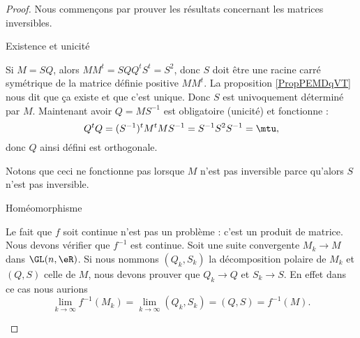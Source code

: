 \begin{proof}
    Nous commençons par prouver les résultats concernant les matrices inversibles.
    \begin{subproof}
        \item[Existence et unicité]

            Si \( M=SQ\), alors \( MM^t=SQQ^tS^t=S^2\), donc \( S\) doit être une racine carré symétrique de la matrice définie positive \( MM^t\). La proposition \ref{PropPEMDqVT} nous dit que ça existe et que c'est unique. Donc \( S\) est univoquement déterminé par \( M\). Maintenant avoir \( Q=MS^{-1}\) est obligatoire (unicité) et fonctionne :
            \begin{equation}
                Q^tQ=(S^{-1})^tM^tMS^{-1}=S^{-1}S^2S^{-1}=\mtu,
            \end{equation}
            donc \( Q\) ainsi défini est orthogonale.

            Notons que ceci ne fonctionne pas lorsque \( M\) n'est pas inversible parce qu'alors \( S\) n'est pas inversible.
        
        \item[Homéomorphisme]

            Le fait que \( f\) soit continue n'est pas un problème : c'est un produit de matrice. Nous devons vérifier que \( f^{-1}\) est continue. Soit une suite convergente \( M_k\to M\) dans \( \GL(n,\eR)\). Si nous nommons \( (Q_k,S_k)\) la décomposition polaire de \( M_k\) et \( (Q,S)\) celle de \( M\), nous devons prouver que \( Q_k\to Q\) et \( S_k\to S\). En effet dans ce cas nous aurions
            \begin{equation}    \label{EqJIkoaJv}
                \lim_{k\to \infty} f^{-1}(M_k)=\lim_{k\to \infty} (Q_k,S_k)=(Q,S)=f^{-1}(M).
            \end{equation}
            

\end{subproof}
\end{proof}
